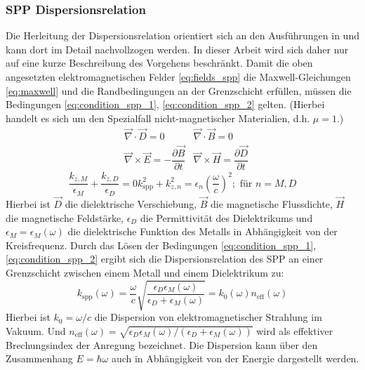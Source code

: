 \documentclass[titlepage,  ngerman]{article}
\begin{document}
	\subsubsection{SPP Dispersionsrelation}
	Die Herleitung der Dispersionsrelation orientiert sich an den Ausführungen in \cite[pp.~261--ff]{Fox.2020} und kann dort im Detail nachvollzogen werden. In dieser Arbeit wird sich daher nur auf eine kurze Beschreibung des Vorgehens beschränkt.
	Damit die oben angesetzten elektromagnetischen Felder \eqref{eq:fields_spp}  die Maxwell-Gleichungen \eqref{eq:maxwell} und die Randbedingungen an der Grenzschicht erfüllen, müssen die Bedingungen \eqref{eq:condition_spp_1},  \eqref{eq:condition_spp_2} gelten. (Hierbei handelt es sich um den Spezialfall nicht-magnetischer Materialien, d.h. $\mu = 1$.)
	\begin{align}
		\label{eq:maxwell}	
		&\vec{\nabla}\cdot\vec{D} = 0		&\vec{\nabla}\cdot\vec{B} = 0 \\
		&\vec{\nabla}\times\vec{E} = -\dfrac{\partial\vec{B}}{\partial t} 
		&\vec{\nabla}\times\vec{H} = 	\dfrac{\partial\vec{D}}{\partial t}\nonumber
	\end{align}
	\begin{subequations}
		\begin{equation}
			\label{eq:condition_spp_1}
			\dfrac{k_{z, M}}{\epsilon_M} + \dfrac{k_{z, D}}{\epsilon_D} = 0
		\end{equation}		
		\begin{equation}
			\label{eq:condition_spp_2}
			k_{\mathrm{spp}}^2 +k_{z, n}^2 = \epsilon_n\left(\dfrac{\omega}{c}\right)^2; \text{ für  } n=M,D
		\end{equation}
	\end{subequations}
	Hierbei ist $\vec{D}$ die dielektrische Verschiebung, $\vec{B}$ die magnetische Flussdichte, $\vec{H}$ die magnetische Feldstärke, 	$\epsilon_D$ die Permittivität des Dielektrikums und $\epsilon_M = \epsilon_M(\omega)$ die dielektrische Funktion des Metalls in Abhängigkeit von der Kreisfrequenz. Durch das Lösen der Bedingungen \eqref{eq:condition_spp_1},  \eqref{eq:condition_spp_2} ergibt sich die Dispersionsrelation des SPP an einer Grenzschicht zwischen einem Metall und einem Dielektrikum zu: 
	\begin{equation}
		\label{eq:dispersion_spp}
		\boxed{
			k_{\mathrm{spp}}\left(\omega\right) = \dfrac{\omega}{c} \sqrt{\dfrac{\epsilon_D\epsilon_M(\omega)}{\epsilon_D + 	\epsilon_M(\omega)}}  = k_0(\omega) n_{\mathrm{eff}}(\omega)}
	\end{equation}
	Hierbei ist $k_0 = \omega / c$ die Dispersion von elektromagnetischer Strahlung im Vakuum. Und $n_{\mathrm{eff}}(\omega) = \sqrt{\epsilon_D\epsilon_M(\omega)/(\epsilon_D + 	\epsilon_M(\omega))}$ wird als effektiver Brechungsindex der Anregung bezeichnet. Die Dispersion kann über den Zusammenhang $E = \hbar \omega$ auch in Abhängigkeit von der Energie dargestellt werden.
	
\end{document}
